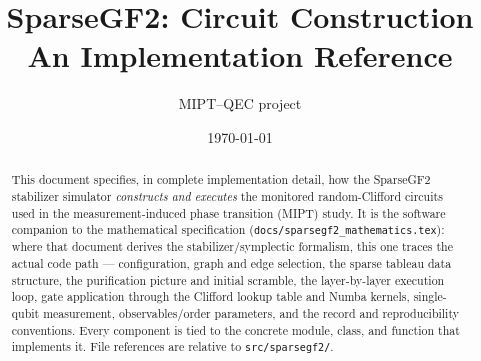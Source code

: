 \documentclass[11pt]{article}
\title{\textbf{SparseGF2: Circuit Construction}\\[2pt]
\large An Implementation Reference}
\author{MIPT--QEC project}
\date{\today}
\newcommand{\file}[1]{\texttt{#1}}
\begin{document}
\maketitle

\begin{abstract}
\noindent This document specifies, in complete implementation detail, how the SparseGF2 stabilizer simulator
\emph{constructs and executes} the monitored random-Clifford circuits used in the measurement-induced phase
transition (MIPT) study. It is the software companion to the mathematical specification
(\file{docs/sparsegf2\_mathematics.tex}): where that document derives the stabilizer/symplectic formalism, this
one traces the actual code path --- configuration, graph and edge selection, the sparse tableau data structure,
the purification picture and initial scramble, the layer-by-layer execution loop, gate application through the
Clifford lookup table and Numba kernels, single-qubit measurement, observables/order parameters, and the record
and reproducibility conventions. Every component is tied to the concrete module, class, and function that
implements it. File references are relative to \file{src/sparsegf2/}.
\end{abstract}

\tableofcontents
\clearpage

\end{document}
